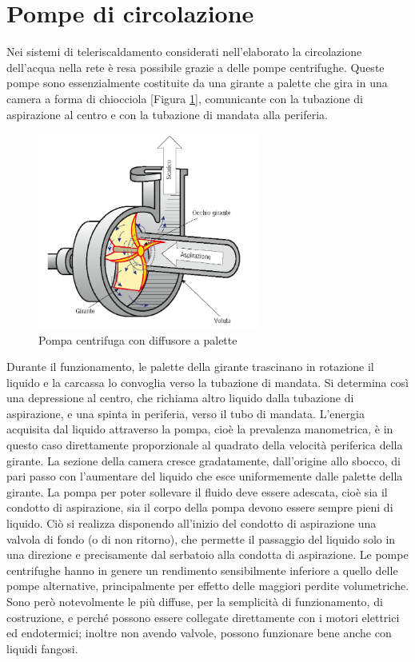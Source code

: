 \documentclass[laurea,oneside,11pt]{USiena_tesiLM3}
\begin{document}
\section{Pompe di circolazione}
Nei sistemi di teleriscaldamento considerati nell'elaborato la circolazione dell'acqua nella rete è resa possibile grazie a delle pompe centrifughe. Queste pompe sono essenzialmente costituite da una girante a palette che gira in una camera a forma di chiocciola [Figura \ref{fig:pompa_centrifuga}], comunicante con la tubazione di aspirazione al centro e con la tubazione di mandata alla periferia.

\begin{figure}[h]
\centering
\includegraphics[width=0.65\textwidth]{figure/pompa_centrifuga} 
\caption{Pompa centrifuga con diffusore a palette}
\label{fig:pompa_centrifuga}
\end{figure}

Durante il funzionamento, le palette della girante trascinano in rotazione il liquido e la carcassa lo convoglia verso la tubazione di mandata.
Si determina così una depressione al centro, che richiama altro liquido dalla tubazione di aspirazione, e una spinta in periferia, verso il tubo di mandata.
L'energia acquisita dal liquido attraverso la pompa, cioè la prevalenza manometrica, è in questo caso direttamente proporzionale al quadrato della velocità periferica della girante.
La sezione della camera cresce gradatamente, dall'origine allo sbocco, di pari passo con l'aumentare del liquido che esce uniformemente dalle palette della girante.
La pompa per poter sollevare il fluido deve
essere adescata, cioè sia il condotto di
aspirazione, sia il corpo della pompa devono essere sempre pieni di liquido. Ciò si realizza disponendo all'inizio del condotto di aspirazione una valvola di fondo (o di non ritorno), che permette il passaggio del liquido solo in una direzione e precisamente dal serbatoio alla condotta di aspirazione.
Le pompe centrifughe hanno in genere un rendimento sensibilmente inferiore a quello delle pompe alternative, principalmente per effetto delle maggiori perdite volumetriche. Sono però notevolmente le più diffuse, per la semplicità di funzionamento, di costruzione, e perché possono essere collegate direttamente con i motori elettrici ed endotermici; inoltre non avendo valvole, possono funzionare bene anche con liquidi fangosi.
\end{document}
